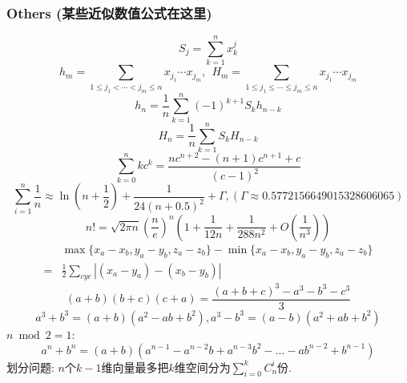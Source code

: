 \begin{footnotesize}
\subsubsection{Others (某些近似数值公式在这里)}
\[ S_j = \sum_{k=1}^nx_k^j \]
\[ h_m = \sum_{1\leq j_1 < \cdots < j_m \leq n} x_{j_1}\cdots x_{j_m},\ \ H_m = \sum_{1\leq j_1 \leq \cdots \leq j_m \leq n} x_{j_1}\cdots x_{j_m} \]
\[ h_n = \frac{1}{n}\sum_{k=1}^n(-1)^{k+1}S_kh_{n-k} \]
\[ H_n = \frac{1}{n}\sum_{k=1}^nS_kH_{n-k} \]
\[ \sum_{k=0}^nkc^k = \frac{nc^{n+2}-(n+1)c^{n+1}+c}{(c-1)^2} \]
\[ \sum_{i=1}^n\frac 1n\approx\ln\left(n + \frac 1 2\right) + \frac{1}{24(n+0.5)^2}+\Gamma,(\Gamma\approx0.5772156649015328606065)\]
\[ n! = \sqrt{2\pi n}(\frac{n}{e})^n(1+\frac{1}{12n}+\frac{1}{288n^2}+O(\frac{1}{n^3})) \]
\[ \begin{aligned}
 &\max{\{x_a-x_b, y_a-y_b, z_a-z_b\}} - \min{\{x_a-x_b, y_a-y_b, z_a-z_b\}} \\
=& \frac{1}{2}\sum_{cyc}\left| (x_a-y_a)-(x_b-y_b) \right|
\end{aligned} \]
\[ (a+b)(b+c)(c+a) = \frac{(a+b+c)^3 - a^3 - b^3 - c^3}{3} \]
\[ a^3+b^3=(a+b)(a^2-ab+b^2),a^3-b^3=(a-b)(a^2+ab+b^2) \]
$n\bmod 2=1:$
\[ a^n+b^n=(a+b)(a^{n-1}-a^{n-2}b+a^{n-3}b^2-...-ab^{n-2}+b^{n-1})\]
划分问题: $n$个$k-1$维向量最多把$k$维空间分为$\sum_{i=0}^{k}C_n^i$份.
\end{footnotesize}
